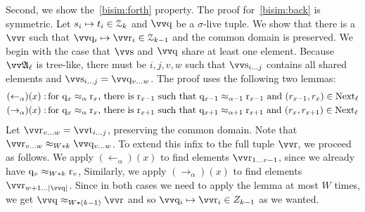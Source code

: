 Second, we show the~\ref{bisim:forth} property.
The proof for~\ref{bisim:back} is symmetric.
Let $s_i \mapsto t_i \in \mathcal{Z}_{k}$ and $\elemtuptupleq$ be a $\sigma$-live tuple.
We show that there is a $\elemtuptupler$ such that $\elemtuptupleq_{i} \mapsto \elemtuptupler_{i} \in \bisimZ_{k-1}$ and the common domain is preserved.
We begin with the case that $\elemtuptuples$ and $\elemtuptupleq$ share at least one element.
Because $\unravel{A}_{\ell}$ is tree-like, there must be $i,j,v,w$ such that $\elemtuptuples_{i\ldots{j}}$ contains all shared elements and $\elemtuptuples_{i\ldots{}j} = \elemtuptupleq_{v\ldots{}w}$.
The proof uses the following two lemmas:
\begin{align*}
  (\leftarrow_{\alpha})(x):&\, \text{for $\mathrm{q}_{x} \approx_{\alpha} \mathrm{r}_{x}$, there is $\mathrm{r}_{x-1}$ such that $\mathrm{q}_{x-1} \approx_{\alpha-1} \mathrm{r}_{x-1}$ and $(r_{x-1}, r_{x}) \in \mathrm{Next}_{\ell}$} \\
  (\rightarrow_{\alpha})(x):&\, \text{for $\mathrm{q}_{x} \approx_{\alpha} \mathrm{r}_{x}$, there is $\mathrm{r}_{x+1}$ such that $\mathrm{q}_{x+1} \approx_{\alpha+1} \mathrm{r}_{x+1}$ and $(r_{x}, r_{x+1}) \in \mathrm{Next}_{\ell}$}
\end{align*}
Let $\elemtuptupler_{v\ldots{}w} = \elemtuptuplet_{i\ldots{}j}$, preserving the common domain.
Note that $\elemtuptupler_{v\ldots{}w} \approx_{W * k} \elemtuptupleq_{v\ldots{}w}$.
To extend this infix to the full tuple $\elemtuptupler$, we proceed as follows.
We apply $(\leftarrow_{\alpha})(x)$ to find elements $\elemtuptupler_{1\ldots{}v-1}$, since we already have $\mathrm{q}_{v} \approx_{W * k} \mathrm{r}_{v}$,
Similarly, we apply $(\rightarrow_{\alpha})(x)$ to find elements $\elemtuptupler_{w+1\ldots{}|\elemtuptupleq|}$.
Since in both cases we need to apply the lemma at most $W$ times, we get $\elemtuptupleq \approx_{W * (k-1)} \elemtuptupler$ and so $\elemtuptupleq_{i} \mapsto \elemtuptupler_{i} \in Z_{k-1}$ as we wanted.
